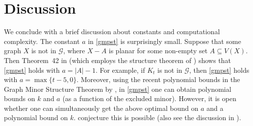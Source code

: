 \documentclass{patmorin}
\DeclareMathOperator{\tw}{tw}
\newcommand{\calG}{\mathcal{G}}
\begin{document}
\section{Discussion}\label{conclusion}

We conclude with a brief discussion about constants and computational complexity.  The constant $a$ in \cref{gmpst} is surprisingly small. Suppose that some graph $X$ is not in $\calG$, where $X-A$ is planar for some non-empty set $A\subseteq V(X)$. Then Theorem~42 in \citep{dujmovic.joret.ea:planar} (which employs the structure theorem of \citet{DvoTho}) shows that \cref{gmpst} holds with $a=|A|-1$. For example, if $K_t$ is not in $\calG$, then \cref{gmpst} holds with $a=\max\{t-5,0\}$. Moreover, using the recent polynomial bounds in the Graph Minor Structure Theorem by \citet{gorsky2025polynomial}, in \cref{gmpst} one can obtain polynomial bounds on $k$ and $a$ (as a function of the excluded minor). However, it is open whether one can simultaneously get the above optimal bound on $a$ and a polynomial bound on $k$. \citet[Conjecture~18.9]{gorsky2025polynomial} conjecture this is possible (also see the discussion in \citep{GSW26}).

\end{document}
